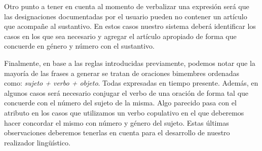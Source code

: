 Otro punto a tener en cuenta al momento de verbalizar una expresión será que las designaciones documentadas por el usuario pueden no contener un artículo que acompañe al sustantivo. En estos casos nuestro sistema deberá identificar los casos en los que sea necesario y agregar el artículo apropiado de forma que concuerde en género y número con el sustantivo. 

Finalmente, en base a las reglas introducidas previamente, podemos notar que la mayoría de las frases a generar se tratan de oraciones bimembres ordenadas como: \emph{sujeto + verbo + objeto}. Todas expresadas en tiempo presente. Además, en algunos casos será necesario conjugar el verbo de una oración de forma tal que concuerde con el número del sujeto de la misma. Algo parecido pasa con el atributo en los casos que utilizamos un verbo copulativo en el que deberemos hacer concordar el mismo con número y género del sujeto. Estas últimas observaciones deberemos tenerlas en cuenta para el desarrollo de nuestro realizador lingüístico.
